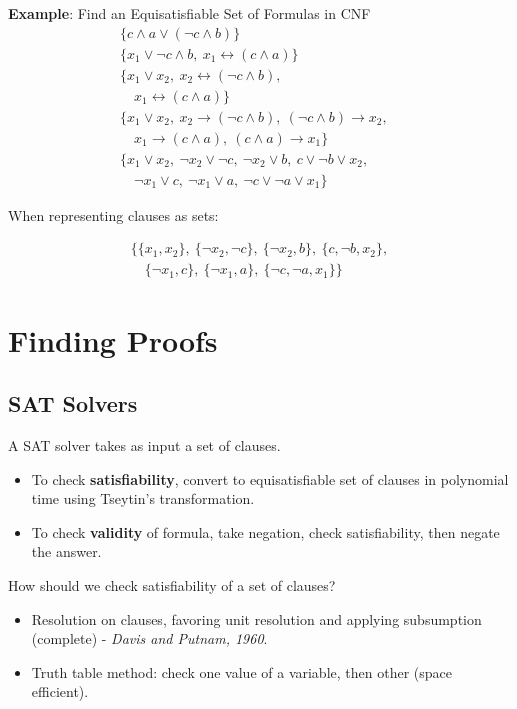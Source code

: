 \documentclass[11pt]{article}
\begin{document}
\textbf{Example}: Find an Equisatisfiable Set of Formulas in CNF 
$$
\begin{array}{l}
	\{\boxed{c \land a} \lor (\neg c \land b) \} \\ [1em]
	\{ x_1 \lor \boxed{\neg c \land b}, \ x_1 \leftrightarrow (c \land a) \}\\[1em]

\{ x_1 \lor x_2, \ x_2 \leftrightarrow (\neg c \land b),  \\
\quad x_1 \leftrightarrow (c \land a) \} & \\[1em]

\{ x_1 \lor x_2, \ x_2 \to (\neg c \land b), \ (\neg c \land b) \to x_2, \\
\quad x_1 \to (c \land a), \ (c \land a) \to x_1 \} & \\[1em]

\{ x_1 \lor x_2, \ \neg x_2 \lor \neg c, \ \neg x_2 \lor b, \ c \lor \neg b \lor x_2, \\
\quad \neg x_1 \lor c, \ \neg x_1 \lor a, \ \neg c \lor \neg a \lor x_1 \} 
\end{array}
$$

\noindent When representing clauses as sets:

$$
\begin{array}{l}
\{ \{x_1, x_2\}, \ \{\neg x_2, \neg c\}, \ \{\neg x_2, b\}, \ \{c, \neg b, x_2\}, \\
\quad \{ \neg x_1, c\}, \ \{\neg x_1, a\}, \ \{\neg c, \neg a, x_1\} \}
\end{array}
$$
\section*{Finding Proofs}

\subsection*{SAT Solvers}

A SAT solver takes as input a set of clauses. 
\begin{itemize}
	\item To check \textbf{satisfiability}, convert to equisatisfiable set of clauses in polynomial time using Tseytin's transformation.
	\item To check \textbf{validity} of formula, take negation, check satisfiability, then negate the answer. 
\end{itemize}

How should we check satisfiability of a set of clauses? 
\begin{itemize}
	\item Resolution on clauses, favoring unit resolution and applying subsumption (complete) - \textit{Davis and Putnam, 1960}.
	\item Truth table method: check one value of a variable, then other (space efficient). 
\end{itemize}
\end{document}
